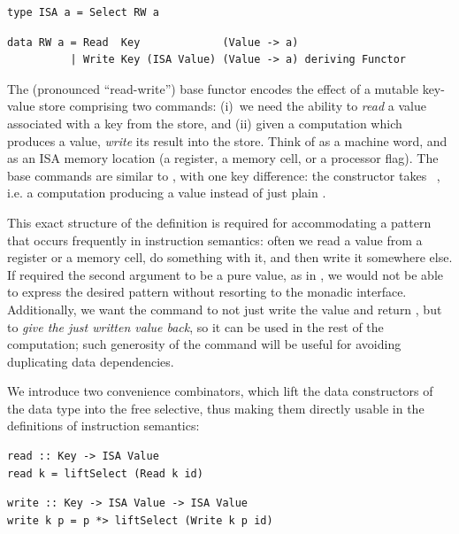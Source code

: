 \vspace{1mm}
\begin{verbatim}
type ISA a = Select RW a
\end{verbatim}
\vspace{1mm}
\begin{verbatim}
data RW a = Read  Key             (Value -> a)
          | Write Key (ISA Value) (Value -> a) deriving Functor
\end{verbatim}
\vspace{1mm}

\noindent
The  (pronounced ``read-write'') base functor encodes the effect of a
mutable key-value store comprising two commands: (i)~we need the ability to
\emph{read} a value associated with a key from the store, and (ii) given a
computation which produces a value, \emph{write} its result into the store.
Think of  as a machine word, and  as an ISA memory location
(a register, a memory cell, or a processor flag). The base commands are similar
to , with one key difference: the  constructor takes
~, i.e. a computation producing a value instead of just plain
.

This exact structure of the definition is required for accommodating a pattern
that occurs frequently in instruction semantics: often we read a value from a
register or a memory cell, do something with it, and then write it somewhere
else. If  required the second argument to be a pure value, as in
, we would not be able to express the desired pattern without
resorting to the monadic interface. Additionally, we want the 
command to not just write the value and return \hs{()}, but to \emph{give the
just written value back}, so it can be used in the rest of the computation; such
generosity of the  command will be useful for avoiding duplicating
data dependencies.

We introduce two convenience combinators, which lift the data constructors of
the  data type into the free selective, thus making them directly usable
in the definitions of instruction semantics:

\vspace{1mm}
\begin{verbatim}
read :: Key -> ISA Value
read k = liftSelect (Read k id)
\end{verbatim}
\vspace{1mm}
\begin{verbatim}
write :: Key -> ISA Value -> ISA Value
write k p = p *> liftSelect (Write k p id)
\end{verbatim}
\vspace{1mm}

